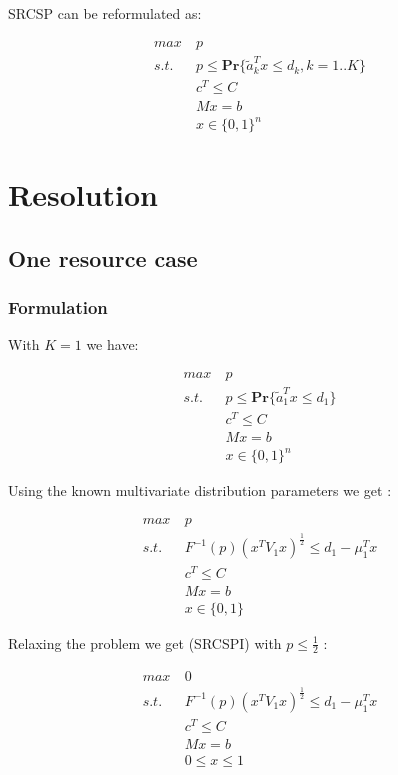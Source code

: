 \documentclass{beamer}
\begin{document}
\begin{frame}

SRCSP can be reformulated as:

\begin{align*}
 max\ & p\\
 s.t.\ & p \leq \mathbf{Pr} \{ \tilde{a}_k^Tx \leq d_k, k=1..K \} \\
 & c^T \leq C \\
 & Mx = b \\
 & x \in \{0, 1\}^n
\end{align*}

\end{frame}

\section{Resolution}
\subsection{One resource case}
\subsubsection{Formulation}
\begin{frame}

With $K=1$ we have:

\begin{align*}
 max\ & p\\
 s.t.\ & p \leq \mathbf{Pr} \{ \tilde{a}_1^Tx \leq d_1 \} \\
 & c^T \leq C \\
 & Mx = b \\
 & x \in \{0, 1\}^n
\end{align*}

\end{frame}

\begin{frame}
Using the known multivariate distribution parameters we get :

\begin{align*}
 max\ & p\\
 s.t.\ & F^{-1}(p)(x^TV_1x)^{\frac{1}{2}} \leq d_1 - \mu_1^Tx \\
 & c^T \leq C \\
 & Mx = b \\
 & x \in \{0,1\}
\end{align*}
\end{frame}

\begin{frame}
Relaxing the problem we get (SRCSPI) with $p \leq \frac{1}{2}$ :

\begin{align*}
 max\ & 0\\
 s.t.\ & F^{-1}(p)(x^TV_1x)^{\frac{1}{2}} \leq d_1 - \mu_1^Tx \\
 & c^T \leq C \\
 & Mx = b \\
 & 0 \leq x \leq 1
\end{align*}
\end{frame}
\end{document}
